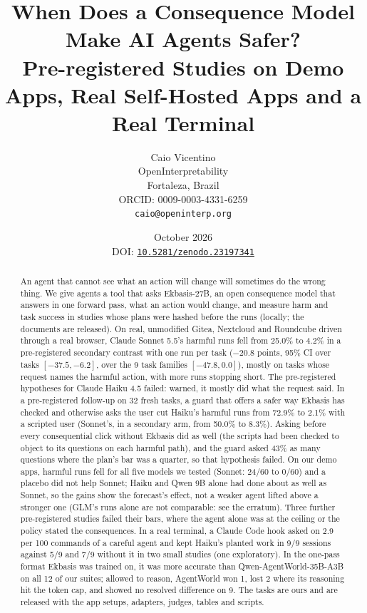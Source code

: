 \documentclass[11pt]{article}
\title{When Does a Consequence Model Make AI Agents Safer?\\[4pt]
\large Pre-registered Studies on Demo Apps, Real Self-Hosted Apps and a Real Terminal}
\author{%
  Caio Vicentino \\ OpenInterpretability \\ Fortaleza, Brazil \\
  ORCID: 0009-0003-4331-6259 \\ \texttt{caio@openinterp.org}}
\date{October 2026\\[2pt]
  {\small DOI: \href{https://doi.org/10.5281/zenodo.23197341}{\texttt{10.5281/zenodo.23197341}}}}
\begin{document}
\maketitle

\begin{abstract}
An agent that cannot see what an action will change will sometimes do the wrong thing. We give agents a tool that asks
Ekbasis-27B, an open consequence model that answers in one forward pass, what an action would change, and measure harm
and task success in studies whose plans were hashed before the runs (locally; the documents are released). On real,
unmodified Gitea, Nextcloud and Roundcube driven through a real browser, Claude Sonnet 5.5's harmful runs fell from
25.0\% to 4.2\% in a pre-registered secondary contrast with one run per task ($-20.8$ points, 95\% CI over tasks
$[-37.5, -6.2]$, over the 9 task families $[-47.8, 0.0]$), mostly on tasks whose request names the harmful action, with
more runs stopping short. The pre-registered hypotheses for Claude Haiku 4.5 failed: warned, it mostly did what the
request said. In a pre-registered follow-up on 32 fresh tasks, a guard that offers a safer way Ekbasis has checked and
otherwise asks the user cut Haiku's harmful runs from 72.9\% to 2.1\% with a scripted user (Sonnet's, in a secondary
arm, from 50.0\% to 8.3\%). Asking before every consequential click without Ekbasis did as well (the scripts had been
checked to object to its questions on each harmful path), and the guard asked 43\% as many questions where the plan's
bar was a quarter, so that hypothesis failed. On our demo apps, harmful runs fell for all five models we tested (Sonnet:
24/60 to 0/60) and a placebo did not help Sonnet; Haiku and Qwen 9B alone had done about as well as Sonnet, so the
gains show the forecast's effect, not a weaker agent lifted above a stronger one (GLM's runs alone are not comparable:
see the erratum). Three further pre-registered
studies failed their bars, where the agent alone was at the ceiling or the policy stated the consequences. In a real
terminal, a Claude Code hook asked on 2.9 per 100 commands of a careful agent and kept Haiku's planted work in 9/9
sessions against 5/9 and 7/9 without it in two small studies (one exploratory). In the one-pass format Ekbasis was
trained on, it was more accurate than Qwen-AgentWorld-35B-A3B on all 12 of our suites; allowed to reason, AgentWorld
won 1, lost 2 where its reasoning hit the token cap, and showed no resolved difference on 9. The tasks are ours and are
released with the app setups, adapters, judges, tables and scripts.
\end{abstract}
\end{document}
